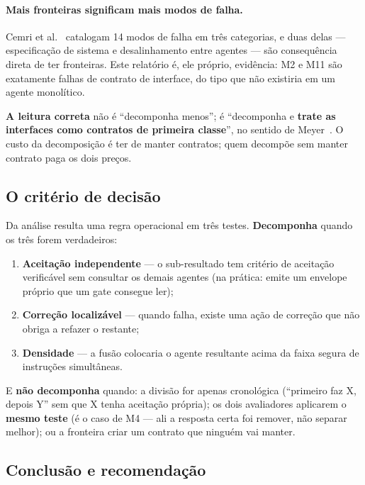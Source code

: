 \documentclass[11pt,a4paper]{article}
\begin{document}
\paragraph{Mais fronteiras significam mais modos de falha.}
Cemri et al.~\cite{cemri2025} catalogam 14 modos de falha em três categorias, e duas delas ---
especificação de sistema e desalinhamento entre agentes --- são consequência direta de ter fronteiras.
Este relatório é, ele próprio, evidência: M2 e M11 são exatamente falhas de contrato de interface, do tipo
que não existiria em um agente monolítico.

\textbf{A leitura correta} não é ``decomponha menos''; é ``decomponha e \textbf{trate as interfaces como
contratos de primeira classe}'', no sentido de Meyer~\cite{meyer1992}. O custo da decomposição é ter de
manter contratos; quem decompõe sem manter contrato paga os dois preços.

\subsection{O critério de decisão}

Da análise resulta uma regra operacional em três testes. \textbf{Decomponha} quando os três forem
verdadeiros:

\begin{enumerate}[leftmargin=*,itemsep=2pt]
  \item \textbf{Aceitação independente} --- o sub-resultado tem critério de aceitação verificável sem
  consultar os demais agentes (na prática: emite um envelope próprio que um gate consegue ler);
  \item \textbf{Correção localizável} --- quando falha, existe uma ação de correção que não obriga a refazer
  o restante;
  \item \textbf{Densidade} --- a fusão colocaria o agente resultante acima da faixa segura de instruções
  simultâneas.
\end{enumerate}

\noindent
E \textbf{não decomponha} quando: a divisão for apenas cronológica (``primeiro faz X, depois Y'' sem que X
tenha aceitação própria); os dois avaliadores aplicarem o \textbf{mesmo teste} (é o caso de M4 --- ali a
resposta certa foi remover, não separar melhor); ou a fronteira criar um contrato que ninguém vai manter.

\subsection{Conclusão e recomendação}
\end{document}

